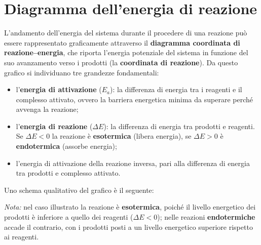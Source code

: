 \documentclass[11pt, a4paper, openright]{book}
\begin{document}
\section{Diagramma dell'energia di reazione}
L'andamento dell'energia del sistema durante il procedere di una reazione può essere rappresentato graficamente attraverso il \textbf{diagramma coordinata di reazione–energia}, che riporta l'energia potenziale del sistema in funzione del suo avanzamento verso i prodotti (la \textbf{coordinata di reazione}).
Da questo grafico si individuano tre grandezze fondamentali:
\begin{itemize}
    \item l'\textbf{energia di attivazione} ($E_a$): la differenza di energia tra i reagenti e il complesso attivato, ovvero la barriera energetica minima da superare perché avvenga la reazione;
    \item l'\textbf{energia di reazione} ($\Delta E$): la differenza di energia tra prodotti e reagenti. Se $\Delta E < 0$ la reazione è \textbf{esotermica} (libera energia), se $\Delta E > 0$ è \textbf{endotermica} (assorbe energia);
    \item l'energia di attivazione della reazione inversa, pari alla differenza di energia tra prodotti e complesso attivato.
\end{itemize}
Uno schema qualitativo del grafico è il seguente:
\begin{center}
\end{center}
\emph{Nota:} nel caso illustrato la reazione è \textbf{esotermica}, poiché il livello energetico dei prodotti è inferiore a quello dei reagenti ($\Delta E < 0$); nelle reazioni \textbf{endotermiche} accade il contrario, con i prodotti posti a un livello energetico superiore rispetto ai reagenti.
\end{document}
